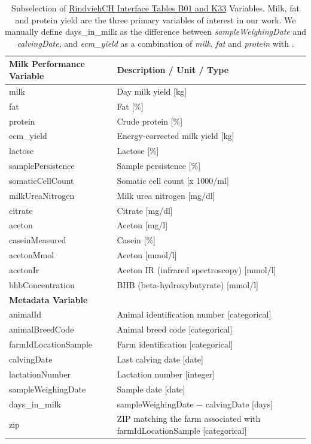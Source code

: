 \begin{table}[H]
    \centering
    \begin{tabular}{ll}
    \midrule
    \textbf{Milk Performance Variable} & \textbf{Description / Unit / Type} \\
    \midrule
    milk & Day milk yield [kg]\\
    fat & Fat [\%] \\
    protein & Crude protein [\%] \\
    ecm\_yield & Energy-corrected milk yield [kg]\\
    \midrule
    lactose & Lactose [\%] \\
    samplePersistence & Sample persistence [\%] \\
    somaticCellCount & Somatic cell count [x 1000/ml] \\
    milkUreaNitrogen & Milk urea nitrogen [mg/dl] \\
    citrate & Citrate [mg/dl]\\
    aceton & Aceton [mg/l] \\
    caseinMeasured & Casein [\%] \\
    acetonMmol & Aceton [mmol/l] \\
    acetonIr & Aceton IR (infrared spectroscopy) [mmol/l] \\
    bhbConcentration & BHB (beta-hydroxybutyrate) [mmol/l] \\
    \midrule
    \textbf{Metadata Variable} & \\
    \midrule
    animalId & Animal identification number [categorical]\\
    animalBreedCode & Animal breed code [categorical]\\
    farmIdLocationSample & Farm identification [categorical]\\
    calvingDate & Last calving date [date]\\
    lactationNumber & Lactation number [integer]\\
    sampleWeighingDate & Sample date [date]\\
    days\_in\_milk & sampleWeighingDate $-$ calvingDate [days]\\
    zip & ZIP matching the farm associated with farmIdLocationSample [categorical] \\
    \bottomrule
    \end{tabular}
    \caption{Subselection of \cite{asr2024} \href{https://asr-ch.ch/images/content/Download-Ordner/Datenschnittstelle/RindviehCH_Interface-D.pdf}{RindviehCH Interface Tables B01 and K33} Variables. Milk, fat and protein yield are the three primary variables of interest in our work. We manually define days\_in\_milk as the difference between \textit{sampleWeighingDate} and \textit{calvingDate}, and \textit{ecm\_yield} as a combination of \textit{milk}, \textit{fat} and \textit{protein} with \cite[Equation 9]{hall_invited_2023}.}
    \label{table:k33_overview}
\end{table}

